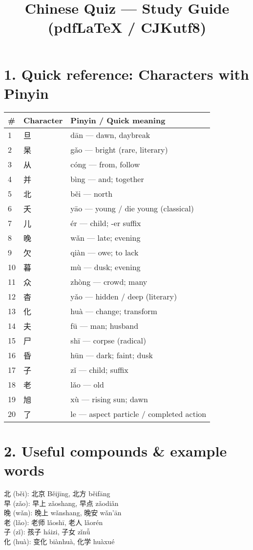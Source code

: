 \documentclass[12pt]{article}
\title{Chinese Quiz — Study Guide (pdfLaTeX / CJKutf8)}
\author{}
\date{}
\begin{document}
\maketitle

\begin{CJK}{UTF8}{gbsn}

\section*{1. Quick reference: Characters with Pinyin}
\begin{longtable}{llp{8cm}}
\toprule
\# & Character & Pinyin / Quick meaning \\
\midrule
1 & 旦 & dān — dawn, daybreak \\
2 & 杲 & gǎo — bright (rare, literary) \\
3 & 从 & cóng — from, follow \\
4 & 并 & bìng — and; together \\
5 & 北 & běi — north \\
6 & 夭 & yāo — young / die young (classical) \\
7 & 儿 & ér — child; -er suffix \\
8 & 晚 & wǎn — late; evening \\
9 & 欠 & qiàn — owe; to lack \\
10 & 暮 & mù — dusk; evening \\
11 & 众 & zhòng — crowd; many \\
12 & 杳 & yǎo — hidden / deep (literary) \\
13 & 化 & huà — change; transform \\
14 & 夫 & fū — man; husband \\
15 & 尸 & shī — corpse (radical) \\
16 & 昏 & hūn — dark; faint; dusk \\
17 & 子 & zǐ — child; suffix \\
18 & 老 & lǎo — old \\
19 & 旭 & xù — rising sun; dawn \\
20 & 了 & le — aspect particle / completed action \\
\bottomrule
\end{longtable}

\section*{2. Useful compounds \& example words}
北 (běi): 北京 Běijīng, 北方 běifāng \\
早 (zǎo): 早上 zǎoshang, 早点 zǎodiǎn \\
晚 (wǎn): 晚上 wǎnshang, 晚安 wǎn'ān \\
老 (lǎo): 老师 lǎoshī, 老人 lǎorén \\
子 (zǐ): 孩子 háizi, 子女 zǐnǚ \\
化 (huà): 变化 biànhuà, 化学 huàxué


\end{CJK}
\end{document}
